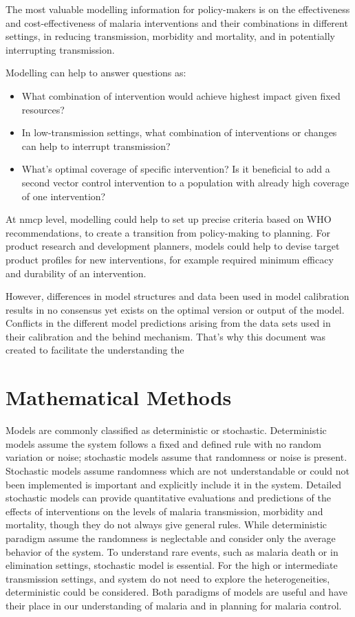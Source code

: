 \documentclass[a4paper, 12pt, twoside]{article}
\begin{document}
The most valuable modelling information for policy-makers is on the effectiveness and cost-effectiveness of malaria interventions and their combinations in different settings, in reducing transmission, morbidity and mortality, and in potentially interrupting transmission.

Modelling can help to answer questions as:

\begin{itemize}
  \item What combination of intervention would achieve highest impact given fixed resources?
  \item In low-transmission settings, what combination of interventions or changes can help to interrupt transmission?
  \item What's optimal coverage of specific intervention? Is it beneficial to add a second vector control intervention to a population with already high coverage of one intervention?
\end{itemize}

At \gls{nmcp} level, modelling could help to set up precise criteria based on WHO recommendations, to create a transition from policy-making to planning. For product research and development planners, models could help to devise target product profiles for new interventions, for example required minimum efficacy and durability of an intervention.

However, differences in model structures and data been used in model calibration results in no consensus yet exists on the optimal version or output of the model.
Conflicts in the different model predictions arising from the data sets used in their calibration and the behind mechanism.
That's why this document was created to facilitate the understanding the

\section{Mathematical Methods}

Models are commonly classified as deterministic or stochastic.
Deterministic models assume the system follows a fixed and defined rule with no random variation or noise; stochastic models assume that randomness or noise is present.
Stochastic models assume randomness which are not understandable or could not been implemented is important and explicitly include it in the system.
Detailed stochastic models can provide quantitative evaluations and predictions of the effects of interventions on the levels of malaria transmission, morbidity and mortality, though they do not always give general rules.
While deterministic paradigm assume the randomness is neglectable and consider only the average behavior of the system.
To understand rare events, such as malaria death or in elimination settings, stochastic model is essential.
For the high or intermediate transmission settings, and system do not need to explore the heterogeneities, deterministic could be considered.
Both paradigms of models are useful and have their place in our understanding of malaria and in planning for malaria control.
\end{document}
